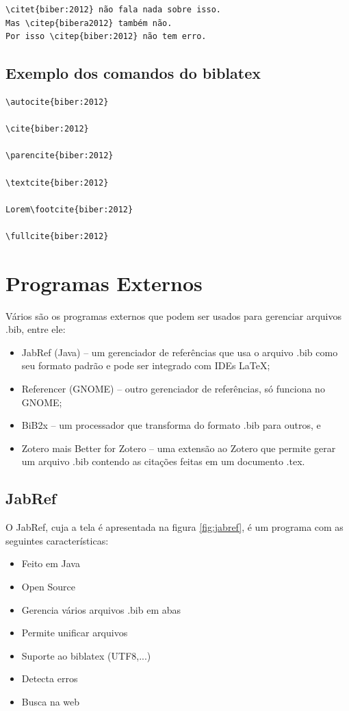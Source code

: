 \begin{lstlisting}[caption={Controlando a forma de citação com o formato natbib.},label=keyfig:citet]
\citet{biber:2012} não fala nada sobre isso. 
Mas \citep{bibera2012} também não. 
Por isso \citep{biber:2012} não tem erro. 
\end{lstlisting}

\subsection{Exemplo dos comandos do biblatex}
\begin{lstlisting}[caption={Exemplo dos comandos do biblatex},
label=com:biblatex]
\autocite{biber:2012}

\cite{biber:2012}

\parencite{biber:2012}

\textcite{biber:2012}

Lorem\footcite{biber:2012}

\fullcite{biber:2012}
\end{lstlisting}





\section{Programas Externos}

Vários são os programas externos que podem ser usados
para gerenciar arquivos .bib, entre ele:

\begin{itemize}
    \item JabRef (Java) -- um gerenciador de referências que usa o arquivo .bib como seu formato padrão e pode ser integrado com IDEs \LaTeX;
    \item Referencer (GNOME) -- outro gerenciador de referências, só funciona no GNOME;
    \item BiB2x  -- um processador que transforma do formato .bib para outros, e
    \item Zotero mais Better  for Zotero -- uma extensão ao Zotero que permite gerar um arquivo .bib contendo as citações feitas em um documento .tex.
\end{itemize}


\subsection{JabRef}
O JabRef, cuja a tela é apresentada na figura \ref{fig:jabref},  é um programa com as seguintes características:
\begin{itemize}
    \item Feito em Java
    \item Open Source
    \item Gerencia vários arquivos .bib em abas
    \item Permite unificar arquivos
    \item Suporte ao biblatex (UTF8,...)
    \item Detecta erros
    \item Busca na web
\end{itemize}



